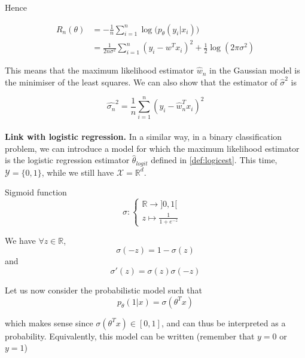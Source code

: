 \documentclass[
10pt, %
a4paper, %
oneside, %
headinclude,footinclude, %
BCOR5mm, %
]{scrartcl}
\begin{document}
Hence 

\begin{equation*}
    \begin{aligned}
	R_n(\theta) &= - \frac{1}{n} \sum^{n}_{i=1} \log\big(p_{\theta}(y_i|x_i)\big)\\
	&= \frac{1}{2n\sigma^2} \sum^{n}_{i=1} (y_i-w^Tx_i)^2+ \frac{1}{2} \log(2\pi \sigma^2)
    \end{aligned}
\end{equation*}

This means that the maximum likelihood estimator $ \hat{w}_n$ in the Gaussian model is the minimiser of the least squares. We can also show that the estimator of $ \hat{\sigma}^2$ is

\begin{equation*}
    \hat{\sigma_n}^2 = \frac{1}{n} \sum^{n}_{i=1} (y_i- \hat{w}_n^Tx_i)^2
\end{equation*}
\\

\textbf{{Link with logistic regression.}} In a similar way, in a binary classification problem, we can introduce a model for which the maximum likelihood estimator is the logistic regression estimator $\hat{\theta}_{logit}$ defined in \ref{def:logicest}. This time, $ \mathcal{Y} = \{0, 1\}$, while we still have $ \mathcal{X}=\mathbb{R}^d$.

\begin{definition}{Sigmoid function}
$$
\sigma  : \left\{
    \begin{array}{ll}
	\mathbb{R} \rightarrow ]0, 1[ \\
	z \mapsto \frac{1}{1+e^{-z}} & 
    \end{array}
\right.
$$

We have $\forall z\in \mathbb{R} $,
\begin{equation*}
    \sigma(-z) = 1- \sigma(z)
\end{equation*}
and
\begin{equation*}
    \sigma'(z) = \sigma(z)\sigma(-z)
\end{equation*}
\end{definition}

Let us now consider the probabilistic model such that
\begin{equation*}
    p_{\theta}(1|x) = \sigma(\theta^Tx)
\end{equation*}

which makes sense since $\sigma(\theta^Tx)\in [0, 1]$, and can thus be interpreted as a probability. Equivalently, this model can be written (remember that $y=0$ or $y=1$)
\end{document}
